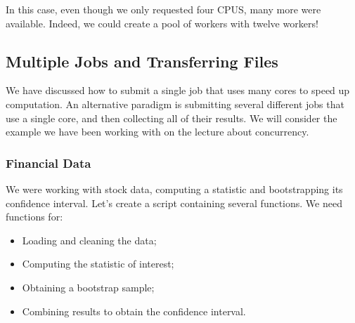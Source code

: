 \documentclass[12pt, a4paper]{article}
\begin{document}
In this case, even though we only requested four CPUS, many more were available.
Indeed, we could create a pool of workers with twelve workers!
\subsection{Multiple Jobs and Transferring Files}
\label{sec:org1f222b2}
We have discussed how to submit a single job that uses many cores to speed up computation.
An alternative paradigm is submitting several different jobs that use a single core, and then collecting all of their results.
We will consider the example we have been working with on the lecture about concurrency.
\subsubsection{Financial Data}
\label{sec:orge8e2598}
We were working with stock data, computing a statistic and bootstrapping its confidence interval.
Let's create a script containing several functions.
We need functions for:
\begin{itemize}
\item Loading and cleaning the data;
\item Computing the statistic of interest;
\item Obtaining a bootstrap sample;
\item Combining results to obtain the confidence interval.
\end{itemize}
\lstset{language=jupyter-python,label= ,caption= ,captionpos=b,numbers=none}
\end{document}
